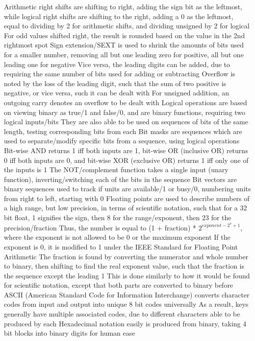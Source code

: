 \documentclass[11 pt, twoside]{article}
\newenvironment{outline*}
{
	\begin{outline}[enumerate]
	}
	{\end{outline}
}
\begin{document}
\begin{outline*}
\2 Arithmetic right shifts are shifting to right, adding the sign bit as the leftmost, while logical right shifts are shifting to the right, adding a 0 as the leftmost, equal to dividing by 2 for arithmetic shifts, and dividing unsigned by 2 for logical
\3 For odd values shifted right, the result is rounded based on the value in the 2nd rightmost spot
\2 Sign extension/SEXT is used to shrink the amounts of bits used for a smaller number, removing all but one leading zero for positive, all but one leading one for negative
\3 Vice versa, the leading digits can be added, due to requiring the same number of bits used for adding or subtracting
\2 Overflow is noted by the loss of the leading digit, such that the sum of two positive is negative, or vice versa, such it can be dealt with
\3 For unsigned addition, an outgoing carry denotes an overflow to be dealt with
\1 Logical operations are based on viewing binary as true/1 and false/0, and are binary functions, requiring two logical inputs/bits
\2 They are also able to be used on sequences of bits of the same length, testing corresponding bits from each
\3 Bit masks are sequences which are used to separate/modify specific bits from a sequence, using logical operations
\2 Bit-wise AND returns 1 iff both inputs are 1, bit-wise OR (inclusive OR) returns 0 iff both inputs are 0, and bit-wise XOR (exclusive OR) returns 1 iff only one of the inputs is 1
\2 The NOT/complement function takes a single input (unary function), inverting/switching each of the bits in the sequence
\1 Bit vectors are binary sequences used to track if units are available/1 or busy/0, numbering units from right to left, starting with 0
\1 Floating points are used to describe numbers of a high range, but low precision, in terms of scientific notation, such that for a 32 bit float, 1 signifies the sign, then 8 for the range/exponent, then 23 for the precision/fraction
\2 Thus, the number is equal to (1 + fraction) * $2^{exponent - 2^7 + 1}$, where the exponent is not allowed to be 0 or the maximum exponent
\3 If the exponent is 0, it is modified to 1 under the IEEE Standard for Floating Point Arithmetic
\2 The fraction is found by converting the numerator and whole number to binary, then shifting to find the real exponent value, such that the fraction is the sequence except the leading 1
\3 This is done similarly to how it would be found for scientific notation, except that both parts are converted to binary before
\1 ASCII (American Standard Code for Information Interchange) converts character codes from input and output into unique 8 bit codes universally
\2 As a result, keys generally have multiple associated codes, due to different characters able to be produced by each
\1 Hexadecimal notation easily is produced from binary, taking 4 bit blocks into binary digits for human ease
\end{outline*}
\end{document}
